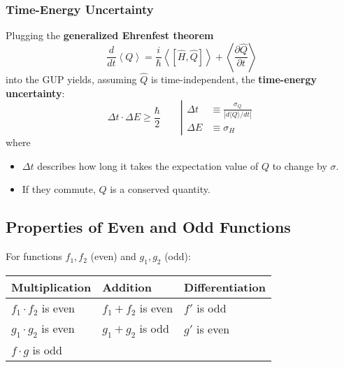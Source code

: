 \subsubsection{Time-Energy Uncertainty}
Plugging the \textbf{generalized Ehrenfest theorem}
\begin{equation*}
    \frac{d}{dt}\left\langle Q\right\rangle=\frac{i}{\hbar}\left\langle\left[\hat{H},\hat{Q}\right]\right\rangle+\left\langle\frac{\partial\hat{Q}}{\partial t}\right\rangle
\end{equation*}
into the GUP yields, assuming $\hat{Q}$ is time-independent, the \textbf{time-energy uncertainty}:
\begin{equation*}
    \Delta t\cdot\Delta E\geqslant\frac\hbar2 \qquad \left|\begin{matrix}
        \Delta t & \equiv \frac{\sigma_Q}{|d\langle Q\rangle/dt|} \\
        \Delta E & \equiv \sigma_H
    \end{matrix}\right.
\end{equation*}
where


\begin{itemize}
    \item $\Delta t$ describes how long it takes the expectation value of $Q$ to change by $\sigma$.
    \item If they commute, $Q$ is a conserved quantity.
\end{itemize}

\subsection{Properties of Even and Odd Functions}
For functions $f_1, f_2$ (even) and $g_1, g_2$ (odd):
\newpar{}
\begin{tabularx}{\linewidth}{@{}XXX@{}}
    Multiplication         & Addition          & Differentiation \\
    \midrule{}
    $f_1\cdot f_2$ is even & $f_1+f_2$ is even & $f'$ is odd     \\
    $g_1\cdot g_2$ is even & $g_1+g_2$ is odd  & $g'$ is even    \\
    $f\cdot g$ is odd      &                   &
\end{tabularx}